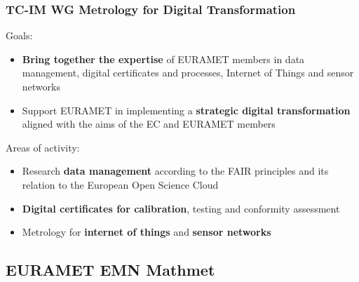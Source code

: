 \documentclass{beamer}
\begin{document}
    \begin{frame}
        \frametitle{TC-IM WG Metrology for Digital Transformation}
        Goals:
        \begin{itemize}
            \item \textbf{Bring together the expertise} of EURAMET members in data management, digital certificates and processes, Internet of Things and sensor networks
            \item Support EURAMET in implementing a \textbf{strategic digital transformation} aligned with the aims of the EC and EURAMET members
        \end{itemize}
        Areas of activity:
        \begin{itemize}
            \item Research \textbf{data management} according to the FAIR principles and its relation to the European Open Science Cloud
            \item \textbf{Digital certificates for calibration}, testing and conformity assessment
            \item Metrology for \textbf{internet of things} and \textbf{sensor networks}
        \end{itemize}
    \end{frame}

    \subsection{EURAMET EMN Mathmet}
\end{document}
